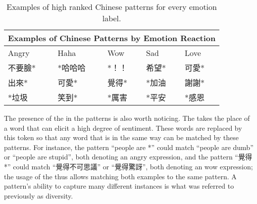 \documentclass[12pt,a4paper]{report}
\theoremstyle{definition}
\begin{document}
\begin{CJK}{UTF8}{bsmi}
\begin{CJK}{UTF8}{bsmi}
    \end{CJK}
    \begin{CJK}{UTF8}{bsmi}
    \begin{table}[H]
    \centering
    \begin{tabular}{ |p{2.5cm}|p{2.5cm}|p{2.5cm}|p{2.5cm}|p{2.5cm}|}
    \hline
    \multicolumn{5}{|c|}{Examples of Chinese Patterns by Emotion Reaction} \\
    \hline Angry & Haha & Wow & Sad & Love \\
    \hline 
    不要臉* & *哈哈哈 & *！！ & 希望* & 可愛* \\
    出來* & 可愛* & 覺得* & *加油 & 謝謝* \\
    *垃圾 & 笑到* & *厲害 & *平安 & *感恩 \\
    \hline
    \end{tabular}
    \caption{Examples of high ranked Chinese patterns for every emotion label.}
    \label{tab:chinese_emo_patterns}
    \end{table}
    \end{CJK}
    \begin{CJK}{UTF8}{bsmi}
    \par The presence of the in the patterns is also worth noticing. The takes the place of a word that can elicit a high degree of sentiment. These words are replaced by this token so that any word that is in the same way can be matched by these patterns. For instance, the pattern “people are *” could match “people are dumb” or “people are stupid”, both denoting an angry expression, and the pattern “覺得*” could match “覺得不可思議” or “覺得驚訝”, both denoting an wow expression; the usage of the thus allows matching both examples to the same pattern. A pattern’s ability to capture many different instances is what was referred to previously as diversity.
    \end{CJK}

\end{CJK}
\end{document}
